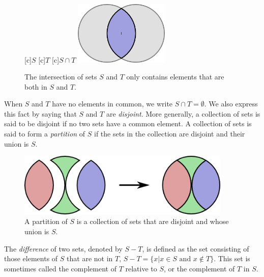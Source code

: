 \begin{figure}[htb!]
\begin{center}
\begin{psfrags}
[c]{$S$}
[c]{$T$}
[c]{$S \cap T$}
\includegraphics[height=3.03cm]{Figures/1Chapter/intersection}
\end{psfrags}
\caption{The intersection of sets $S$ and $T$ only contains elements that are both in $S$ and $T$.}
\end{center}
\end{figure}

When $S$ and $T$ have no elements in common, we write $S \cap T = \emptyset$.
We also express this fact by saying that $S$ and $T$ are \emph{disjoint}.
More generally, a collection of sets is said to be disjoint if no two sets have a common element.
A collection of sets is said to form a \emph{partition} of $S$ if the sets in the collection are disjoint and their union is $S$.

\begin{figure}[htb]
\begin{center}
\includegraphics[height=3.03cm]{Figures/1Chapter/setpartition}
\caption{A partition of $S$ is a collection of sets that are disjoint and whose union is $S$.}
\end{center}
\end{figure}

The \emph{difference} of two sets, denoted by $S - T$, is defined as the set consisting of those elements of $S$ that are not in $T$, $S - T = \{ x | x \in S \text{ and } x \notin T \}$.
This set is sometimes called the complement of $T$ relative to $S$, or the complement of $T$ in $S$.

